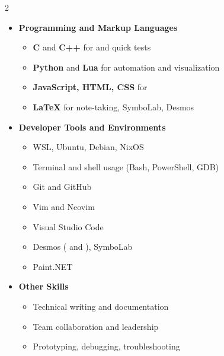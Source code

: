 \documentclass[letterpaper,11pt]{article}
\begin{document}
\begin{multicols}{2}
\begin{itemize}[leftmargin=0in, label={}]
  \item[] {\textbf{Programming and Markup Languages}}
    \begin{itemize}
      \item \textbf{C} and \textbf{C++} for \href{https://github.com/gmf-uah/git-gud/blob/main/Grant/390/p3/fink_cs390program3.c}{} and quick tests
      \item \textbf{Python} and \textbf{Lua} for automation and visualization
      \item \textbf{JavaScript, HTML, CSS} for \href{https://gmf-uah.github.io/BabylonJS-Demo/}{}
      \item \textbf{LaTeX} for note-taking, SymboLab, Desmos
    \end{itemize}
  \item[] {\textbf{Developer Tools and Environments}}
    \begin{itemize}
      \item WSL, Ubuntu, Debian, NixOS
      \item Terminal and shell usage (Bash, PowerShell, GDB)
      \item Git and GitHub
      \item Vim and Neovim
      \item Visual Studio Code
      \item Desmos (\href{https://www.desmos.com/calculator/zv6qvlqto3}{} and \href{https://www.desmos.com/3d/whxeqamhix}{}), SymboLab
      \item Paint.NET
    \end{itemize}
  \item[] {\textbf{Other Skills}}
    \begin{itemize}
      \item Technical writing and documentation
      \item Team collaboration and leadership
      \item Prototyping, debugging, troubleshooting
    \end{itemize}
\end{itemize}
\end{multicols}

\end{document}
